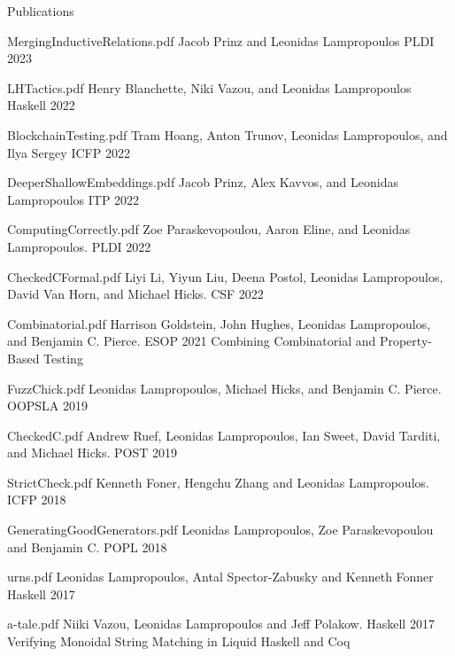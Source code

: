 \documentclass{resume} %
\begin{document}
\begin{rSection}{Publications}

    {MergingInductiveRelations.pdf}
    {Jacob Prinz and Leonidas Lampropoulos}
    {PLDI 2023}
  
    {LHTactics.pdf}
    {Henry Blanchette, Niki Vazou, and Leonidas Lampropoulos}
    {Haskell 2022}
  
    {BlockchainTesting.pdf}
    {Tram Hoang, Anton Trunov, Leonidas Lampropoulos, and Ilya Sergey}
    {ICFP 2022}
  
    {DeeperShallowEmbeddings.pdf}
    {Jacob Prinz, Alex Kavvos, and Leonidas Lampropoulos}
    {ITP 2022}
  
    {ComputingCorrectly.pdf}
    {Zoe Paraskevopoulou, Aaron Eline, and Leonidas Lampropoulos.}
    {PLDI 2022}
  
    {CheckedCFormal.pdf}
    {Liyi Li, Yiyun Liu, Deena Postol, Leonidas Lampropoulos, David Van Horn, and Michael Hicks.}
    {CSF 2022}

    {Combinatorial.pdf}
    {Harrison Goldstein, John Hughes, Leonidas Lampropoulos, and Benjamin C. Pierce.}
    {ESOP 2021}
    {Combining Combinatorial and Property-Based Testing}    
    
    {FuzzChick.pdf}
    {Leonidas Lampropoulos, Michael Hicks, and Benjamin C. Pierce.}
    {OOPSLA 2019}
    
    {CheckedC.pdf}
    {Andrew Ruef, Leonidas Lampropoulos, Ian Sweet, David Tarditi, and Michael Hicks.}
    {POST 2019}

    {StrictCheck.pdf}
    {Kenneth Foner, Hengchu Zhang and Leonidas Lampropoulos.}
    {ICFP 2018}

    {GeneratingGoodGenerators.pdf}
    {Leonidas Lampropoulos, Zoe Paraskevopoulou and Benjamin C.}
    {POPL 2018}

    {urns.pdf}
    {Leonidas Lampropoulos, Antal Spector-Zabusky and Kenneth Fonner}
    {Haskell 2017}

    {a-tale.pdf}
    {Niiki Vazou, Leonidas Lampropoulos and Jeff Polakow.}
    {Haskell 2017}
    {Verifying Monoidal String Matching in Liquid Haskell and Coq}


\end{rSection}
\end{document}
